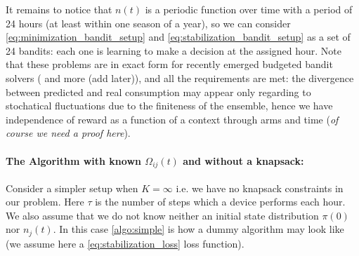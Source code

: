 It remains to notice that $n(t)$ is a periodic function over time with a period of 24 hours (at least within one season of a year), so we can consider \ref{eq:minimization_bandit_setup} and \ref{eq:stabilization_bandit_setup} as a set of 24 bandits: each one is learning to make a decision at the assigned hour. Note that these problems are in exact form for recently emerged budgeted bandit solvers (\cite{Badanidiyuru2013} and more (add later)), and all the requirements are met: the divergence between predicted and real consumption may appear only regarding to stochatical fluctuations due to the finiteness of the ensemble, hence we have independence of reward as a function of a context through arms and time (\textit{of course we need a proof here}). 


\paragraph{The Algorithm with known $\Omega_{ij}(t)$ and without a knapsack:} Consider a simpler setup when $K = \infty$ i.e. we have no knapsack constraints in our problem. Here $\tau$ is the number of steps which a device performs each hour. We also assume that we do not know neither an initial state distribution $\pi(0)$ nor $n_j(t)$. In this case \ref{algo:simple} is how a dummy algorithm may look like (we assume here a \ref{eq:stabilization_loss} loss function).

